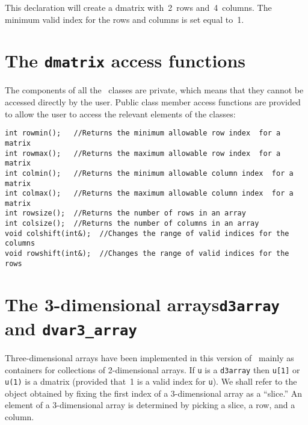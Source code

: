 \documentclass{admbmanual}
\begin{document}
This declaration will create a dmatrix with~2~rows
and~4~columns. The minimum valid index for the rows and columns is
set equal to~1.


\section{The \texttt{dmatrix} access functions}

The components of all the \scAD\ classes are private, which means that
they cannot be accessed directly by the user. 
Public class member access functions are provided
to allow the user to access the relevant elements of the classes:
\begin{lstlisting}
int rowmin();   //Returns the minimum allowable row index  for a matrix
int rowmax();   //Returns the maximum allowable row index  for a matrix
int colmin();   //Returns the minimum allowable column index  for a matrix
int colmax();   //Returns the maximum allowable column index  for a matrix
int rowsize();  //Returns the number of rows in an array
int colsize();  //Returns the number of columns in an array
void colshift(int&);  //Changes the range of valid indices for the columns
void rowshift(int&);  //Changes the range of valid indices for the rows 
\end{lstlisting}


\section{The 3-dimensional arrays\br \texttt{d3array} and \texttt{dvar3\_array}}

Three-dimensional arrays have been implemented in this version of
\scAD\ mainly as containers for collections of 2-dimensional arrays. 
If \texttt{u} is a \texttt{d3array} then \texttt{u[1]} or
\texttt{u(1)} is a dmatrix (provided that~1 is a valid index for \texttt{u}). 
We shall refer to the object
obtained by fixing the first index of a 3-dimensional
array as a ``slice.'' An element of a 3-dimensional array is determined by picking a slice, a row, and a column.
\end{document}
